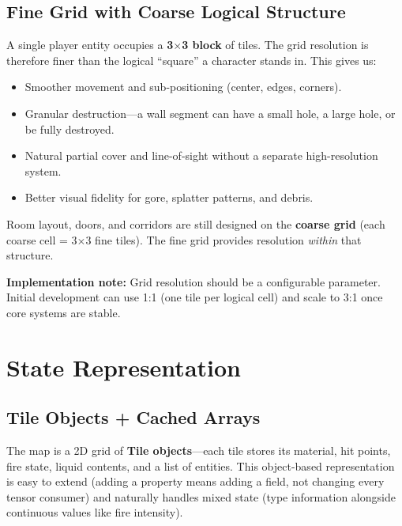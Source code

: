 \documentclass[11pt,a4paper]{article}
\begin{document}
\subsection{Fine Grid with Coarse Logical Structure}

A single player entity occupies a \textbf{3$\times$3 block} of tiles.
The grid resolution is therefore finer than the logical ``square'' a
character stands in.  This gives us:

\begin{itemize}
    \item Smoother movement and sub-positioning (center, edges, corners).
    \item Granular destruction---a wall segment can have a small hole,
          a large hole, or be fully destroyed.
    \item Natural partial cover and line-of-sight without a separate
          high-resolution system.
    \item Better visual fidelity for gore, splatter patterns, and debris.
\end{itemize}

Room layout, doors, and corridors are still designed on the
\textbf{coarse grid} (each coarse cell = 3$\times$3 fine tiles).
The fine grid provides resolution \emph{within} that structure.

\medskip
\noindent\textbf{Implementation note:}  Grid resolution should be a
configurable parameter.  Initial development can use 1:1 (one tile per
logical cell) and scale to 3:1 once core systems are stable.

\section{State Representation}
\label{sec:state}

\subsection{Tile Objects + Cached Arrays}

The map is a 2D grid of \textbf{Tile objects}---each tile stores its
material, hit points, fire state, liquid contents, and a list of
entities.  This object-based representation is easy to extend (adding a
property means adding a field, not changing every tensor consumer) and
naturally handles mixed state (type information alongside continuous
values like fire intensity).
\end{document}
